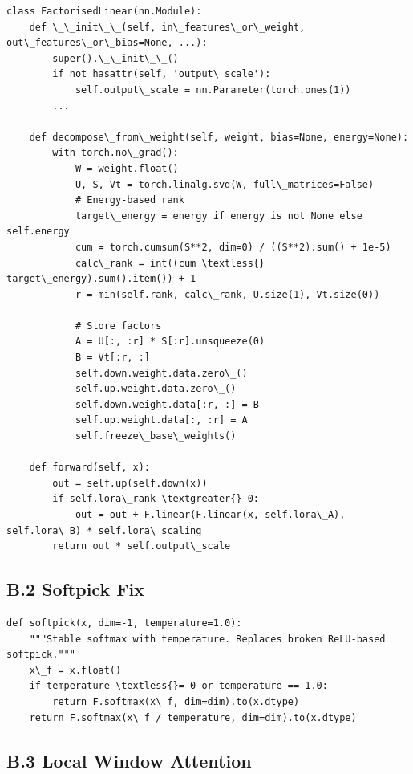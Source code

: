 \begin{lstlisting}
class FactorisedLinear(nn.Module):
    def \_\_init\_\_(self, in\_features\_or\_weight, out\_features\_or\_bias=None, ...):
        super().\_\_init\_\_()
        if not hasattr(self, 'output\_scale'):
            self.output\_scale = nn.Parameter(torch.ones(1))
        ...
    
    def decompose\_from\_weight(self, weight, bias=None, energy=None):
        with torch.no\_grad():
            W = weight.float()
            U, S, Vt = torch.linalg.svd(W, full\_matrices=False)
            # Energy-based rank
            target\_energy = energy if energy is not None else self.energy
            cum = torch.cumsum(S**2, dim=0) / ((S**2).sum() + 1e-5)
            calc\_rank = int((cum \textless{} target\_energy).sum().item()) + 1
            r = min(self.rank, calc\_rank, U.size(1), Vt.size(0))
            
            # Store factors
            A = U[:, :r] * S[:r].unsqueeze(0)
            B = Vt[:r, :]
            self.down.weight.data.zero\_()
            self.up.weight.data.zero\_()
            self.down.weight.data[:r, :] = B
            self.up.weight.data[:, :r] = A
            self.freeze\_base\_weights()
    
    def forward(self, x):
        out = self.up(self.down(x))
        if self.lora\_rank \textgreater{} 0:
            out = out + F.linear(F.linear(x, self.lora\_A), self.lora\_B) * self.lora\_scaling
        return out * self.output\_scale
\end{lstlisting}

\subsection{B.2 Softpick Fix}

\begin{lstlisting}
def softpick(x, dim=-1, temperature=1.0):
    """Stable softmax with temperature. Replaces broken ReLU-based softpick."""
    x\_f = x.float()
    if temperature \textless{}= 0 or temperature == 1.0:
        return F.softmax(x\_f, dim=dim).to(x.dtype)
    return F.softmax(x\_f / temperature, dim=dim).to(x.dtype)
\end{lstlisting}

\subsection{B.3 Local Window Attention}

